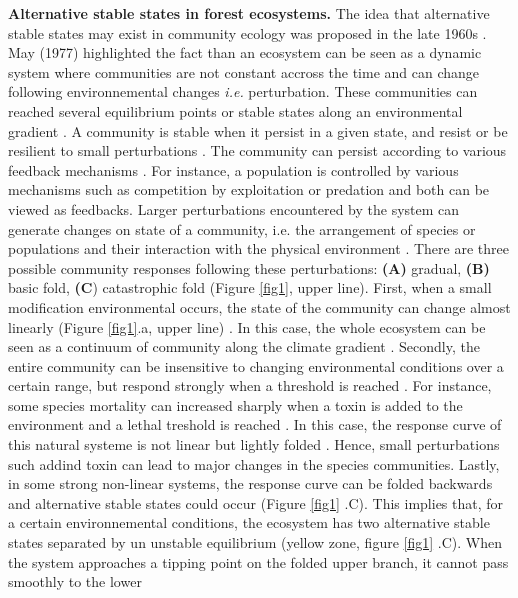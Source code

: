 \textbf{Alternative stable states in forest ecosystems.} The idea that
alternative stable states may exist in community ecology was proposed in the
late 1960s \cite{Scheffer2001,Society2014a}.  May (1977) \cite{May1977}
highlighted the fact than an ecosystem can be seen as a dynamic system where
communities are not constant accross the time and can change following
environnemental changes \textit{i.e.} perturbation. These communities can
reached several equilibrium points or stable states along an environmental
gradient \cite{May1977}.   A community is  stable when it persist in a given
state, and resist or be resilient to small perturbations \cite{Filbee-
Dexter2013}.    The community can persist according to various feedback
mechanisms \cite{Filbee-Dexter2013}. For instance,  a population is controlled
by various mechanisms such as competition by exploitation or predation and
both can be viewed as feedbacks.  Larger perturbations encountered by the
system can generate changes on state of a community, i.e. the arrangement of
species or populations and their interaction with the physical environment
\cite {Filbee-Dexter2013}. There are three possible community responses
following these perturbations: \textbf{(A)} gradual, \textbf{(B)} basic fold,
\textbf{(C}) catastrophic fold \cite{Scheffer2001} (Figure \ref{fig1}, upper
line). First, when a small modification environmental occurs, the state of the
community can change almost linearly (Figure \ref{fig1}.a, upper line)
\cite{Scheffer2001,Scheffer2009}. In this case, the whole ecosystem can be
seen as a continuum of community along the climate gradient
\cite{Scheffer2001,Scheffer2009,scheffer2009critical}. Secondly, the entire
community can be insensitive to changing environmental conditions over a
certain range, but respond strongly when a threshold is reached
\cite{scheffer2009critical}. For instance, some species mortality can
increased sharply when a toxin is added to the environment and a lethal
treshold is reached \cite{scheffer2009critical}. In this case, the response
curve of this natural systeme is not linear but lightly folded . Hence,  small
perturbations such addind toxin can lead to major changes in the species
communities. Lastly, in some strong non-linear systems, the response curve can
be folded backwards and alternative stable states could occur (Figure
\ref{fig1} .C).  This implies that, for a certain environnemental conditions,
the ecosystem has two alternative stable states separated by un unstable
equilibrium (yellow zone, figure \ref{fig1} .C). When the system approaches a
tipping point on the folded upper branch, it cannot pass smoothly to the lower
